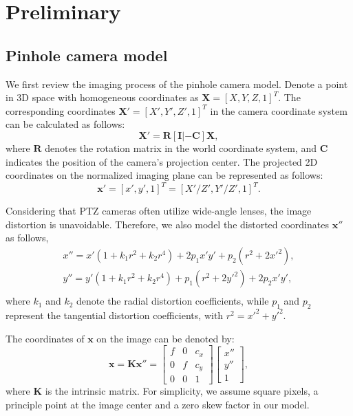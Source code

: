 \section{Preliminary}
\label{sec:PRELIMINARY}

\subsection{Pinhole camera model}

We first review the imaging process of the pinhole camera model. Denote a point in 3D space with homogeneous coordinates as $\mathbf{X}= [X,Y,Z,1]^T$. The corresponding coordinates $\mathbf{X'}=[X',Y',Z',1]^T$ in the camera coordinate system can be calculated as follows:
\begin{equation}
\mathbf{X'} = \mathbf{R}[\mathbf{I}|-\mathbf{C}] \mathbf{X},
\end{equation}
where $\mathbf{R}$ denotes the rotation matrix in the world coordinate system, and $\mathbf{C}$ indicates the position of the camera's projection center. The projected 2D coordinates on the normalized imaging plane can be represented as follows:
\begin{equation}
\mathbf{x}' = [x',y',1]^T = [X'/Z',Y'/Z',1]^T.
\end{equation}

Considering that PTZ cameras often utilize wide-angle lenses, the image distortion is unavoidable. Therefore, we also model the distorted coordinates $\mathbf{x}''$ as follows,
\begin{equation}
\begin{aligned}
    x'' = {x'(1 + {k_1}{r^2} + {k_2}{r^4}) + 2{p_1}x'y' + {p_2}({r^2} + 2{{x'}^2})},\\
    y'' = {y'(1 + {k_1}{r^2} + {k_2}{r^4}) + {p_1}({r^2} + 2{{y'}^2}) + 2{p_2}x'y'},\\
\end{aligned}
\end{equation}
\noindent where $k_1$ and $k_2$ denote the radial distortion coefficients, while $p_1$ and $p_2$ represent the tangential distortion coefficients, with ${r^2} = {{x'}^2} + {{y'}^2}$. 

The coordinates of $\mathbf{x}$ on the image can be denoted by:
\begin{equation}
\mathbf{x} = \mathbf{K}\mathbf{x}'' 
= 
\begin{bmatrix}
    f & 0 & c_x \\
    0 & f & c_y \\
    0 & 0 & 1
\end{bmatrix}
\begin{bmatrix}
    x'' \\
    y'' \\
    1
\end{bmatrix},
\end{equation}
\noindent where $\mathbf{K}$ is the intrinsic matrix. For simplicity, we assume square pixels, a principle point at the image center and a zero skew factor in our model.

